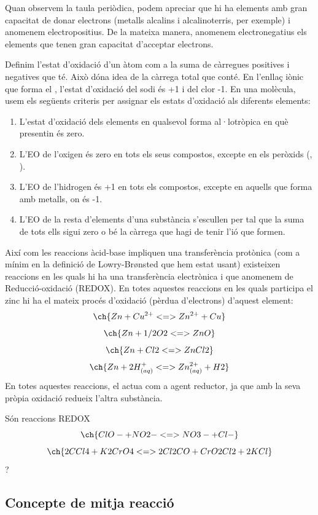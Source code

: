 Quan observem la taula periòdica, podem apreciar que hi ha elements amb gran capacitat de donar electrons (metalls alcalins i alcalinoterris, per exemple) i anomenem electropositius. 
De la mateixa manera, anomenem electronegatius els elements que tenen gran capacitat d'acceptar electrons.

Definim l'estat d'oxidació d'un àtom com a la suma de càrregues positives i negatives que té. Això dóna idea de la càrrega total que conté.
En l'enllaç iònic que forma el , l'estat d'oxidació del sodi és +1 i del clor -1.
En una molècula, usem els següents criteris per assignar els estats d'oxidació als diferents elements:
\begin{enumerate}
\item L'estat d'oxidació dels elements en qualsevol forma al·lotròpica en què  presentin és zero.
\item L'EO de l'oxigen és zero en tots els seus compostos, excepte en els peròxids (, ).
\item L'EO de l'hidrogen és +1 en tots els compostos, excepte en aquells que forma amb metalls, on és -1.
\item L'EO de la resta d'elements d'una substància s'escullen per tal que la suma de tots ells sigui zero o bé la càrrega que hagi de tenir l'ió que formen.
\end{enumerate}

Així com les reaccions àcid-base impliquen una transferència protònica (com a mínim en la definició de Lowry-Br{\o}nsted que hem estat usant) existeixen reaccions en les quals hi ha una transferència electrònica i que anomenem de Reducció-oxidació (REDOX). En totes aquestes reaccions en les quals participa el zinc hi ha el mateix procés d'oxidació (pèrdua d'electrons) d'aquest element:
\[\ch{Zn + Cu^{2+} <=> Zn^{2+} + Cu}\]
\[\ch{Zn + 1/2 O2 <=> ZnO}\]
\[\ch{Zn + Cl2 <=> ZnCl2}\]
\[\ch{Zn + 2 H^+_{(aq)} <=> Zn^{2+}_{(aq)} + H2}\]
En totes aquestes reaccions, el  actua com a agent reductor, ja que amb la seva pròpia oxidació redueix l'altra substància. 

\begin{exr}
Són reaccions REDOX
\[\ch{ClO- + NO2- <=> NO3- + Cl-} \]
\[\ch{2 CCl4 + K2CrO4 <=> 2 Cl2CO + CrO2Cl2 + 2 KCl} \]?
\end{exr}


\subsection{Concepte de mitja reacció}

